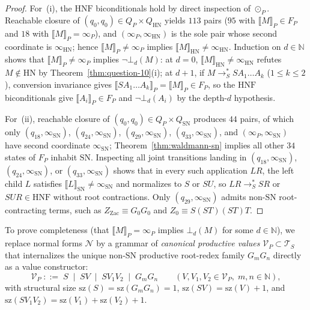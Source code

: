 \documentclass[11pt,reqno]{amsart}
\numberwithin{equation}{section}
\theoremstyle{plain}
\theoremstyle{definition}
\theoremstyle{remark}
\newcommand{\TS}{\mathcal{T}_S}
\newcommand{\HNF}{\mathrm{HNF}}
\newcommand{\SN}{\mathrm{SN}}
\newcommand{\HN}{\mathrm{HN}}
\newcommand{\sem}[1]{\llbracket #1 \rrbracket}
\newcommand{\redSs}{\to_S^*}
\begin{document}
\begin{proof}
For~(i), the $\HNF$ biconditionals hold by direct inspection of $\odot_P$. Reachable closure of $(q_0, q_0) \in Q_P \times Q_{\HN}$ yields $113$ pairs ($95$ with $\sem{M}_P \in F_P$ and $18$ with $\sem{M}_P = \infty_P$), and $(\infty_P, \infty_{\HN})$ is the sole pair whose second coordinate is $\infty_{\HN}$; hence $\sem{M}_P \neq \infty_P$ implies $\sem{M}_{\HN} \neq \infty_{\HN}$. Induction on $d \in \mathbb{N}$ shows that $\sem{M}_P \neq \infty_P$ implies $\neg\bot_d(M)$: at $d = 0$, $\sem{M}_{\HN} \neq \infty_{\HN}$ refutes $M \notin \HN$ by Theorem~\ref{thm:question-10}(i); at $d + 1$, if $M \redSs S A_1 \dots A_k$ ($1 \le k \le 2$), conversion invariance gives $\sem{S A_1 \dots A_k}_P = \sem{M}_P \in F_P$, so the $\HNF$ biconditionals give $\sem{A_i}_P \in F_P$ and $\neg\bot_d(A_i)$ by the depth-$d$ hypothesis.

For~(ii), reachable closure of $(q_0, q_0) \in Q_P \times Q_{\SN}$ produces $44$ pairs, of which only $(q_{18}, \infty_{\SN})$, $(q_{24}, \infty_{\SN})$, $(q_{29}, \infty_{\SN})$, $(q_{33}, \infty_{\SN})$, and $(\infty_P, \infty_{\SN})$ have second coordinate $\infty_{\SN}$; Theorem~\ref{thm:waldmann-sn} implies all other $34$ states of $F_P$ inhabit $\SN$. Inspecting all joint transitions landing in $(q_{18}, \infty_{\SN})$, $(q_{24}, \infty_{\SN})$, or $(q_{33}, \infty_{\SN})$ shows that in every such application $L R$, the left child $L$ satisfies $\sem{L}_{\SN} \neq \infty_{\SN}$ and normalizes to $S$ or $S U$, so $L R \redSs S R$ or $S U R \in \HNF$ without root contractions. Only $(q_{29}, \infty_{\SN})$ admits non-$\SN$ root-contracting terms, such as $Z_{\mathrm{Zac}} \equiv G_0 G_0$ and $Z_0 \equiv S(S T)(S T)T$.
\end{proof}

To prove completeness (that $\sem{M}_P = \infty_P$ implies $\bot_d(M)$ for some $d \in \mathbb{N}$), we replace normal forms $\mathcal{N}$ by a grammar of \emph{canonical productive values} $\mathcal{V}_P \subset \TS$ that internalizes the unique non-$\SN$ productive root-redex family $G_m G_n$ directly as a value constructor:
\begin{equation}\label{eq:pval-grammar}
\mathcal{V}_P \;::=\; S \;\mid\; S V \;\mid\; S V_1 V_2 \;\mid\; G_m G_n
\qquad (V, V_1, V_2 \in \mathcal{V}_P,\; m, n \in \mathbb{N}),
\end{equation}
with structural size $\mathrm{sz}(S) = \mathrm{sz}(G_m G_n) = 1$, $\mathrm{sz}(S V) = \mathrm{sz}(V) + 1$, and $\mathrm{sz}(S V_1 V_2) = \mathrm{sz}(V_1) + \mathrm{sz}(V_2) + 1$.
\end{document}
